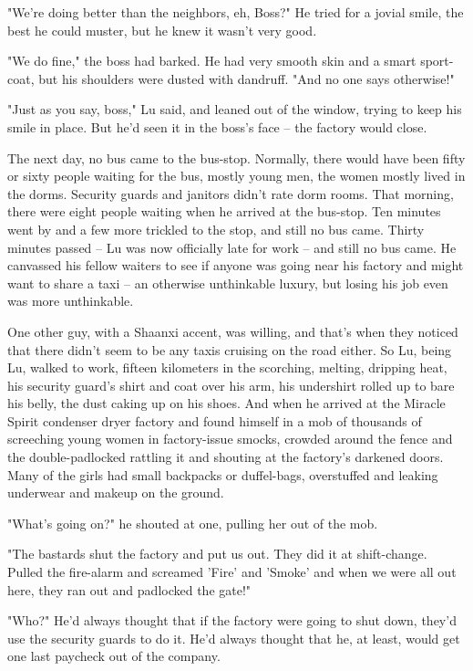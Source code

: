 "We're doing better than the neighbors, eh, Boss?" He tried for a
jovial smile, the best he could muster, but he knew it wasn't very
good.

"We do fine," the boss had barked. He had very smooth skin and a
smart sport-coat, but his shoulders were dusted with dandruff. "And
no one says otherwise!"

"Just as you say, boss," Lu said, and leaned out of the window,
trying to keep his smile in place. But he'd seen it in the boss's
face -- the factory would close.

The next day, no bus came to the bus-stop. Normally, there would
have been fifty or sixty people waiting for the bus, mostly young
men, the women mostly lived in the dorms. Security guards and
janitors didn't rate dorm rooms. That morning, there were eight
people waiting when he arrived at the bus-stop. Ten minutes went by
and a few more trickled to the stop, and still no bus came. Thirty
minutes passed -- Lu was now officially late for work -- and still
no bus came. He canvassed his fellow waiters to see if anyone was
going near his factory and might want to share a taxi -- an
otherwise unthinkable luxury, but losing his job even was more
unthinkable.

One other guy, with a Shaanxi accent, was willing, and that's when
they noticed that there didn't seem to be any taxis cruising on the
road either. So Lu, being Lu, walked to work, fifteen kilometers in
the scorching, melting, dripping heat, his security guard's shirt
and coat over his arm, his undershirt rolled up to bare his belly,
the dust caking up on his shoes. And when he arrived at the Miracle
Spirit condenser dryer factory and found himself in a mob of
thousands of screeching young women in factory-issue smocks,
crowded around the fence and the double-padlocked rattling it and
shouting at the factory's darkened doors. Many of the girls had
small backpacks or duffel-bags, overstuffed and leaking underwear
and makeup on the ground.

"What's going on?" he shouted at one, pulling her out of the mob.

"The bastards shut the factory and put us out. They did it at
shift-change. Pulled the fire-alarm and screamed 'Fire' and 'Smoke'
and when we were all out here, they ran out and padlocked the
gate!"

"Who?" He'd always thought that if the factory were going to shut
down, they'd use the security guards to do it. He'd always thought
that he, at least, would get one last paycheck out of the company.

